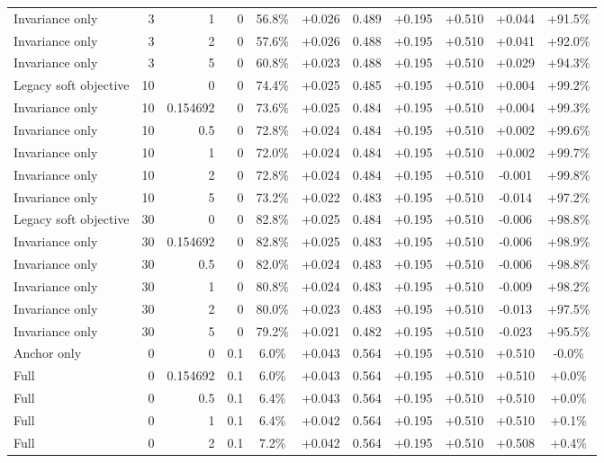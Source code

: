 \begin{table}[htbp]
\begin{tabular}{lrrrccccccc}
Invariance only & 3 & 1 & 0 & 56.8\% & +0.026 & 0.489 & +0.195 & +0.510 & +0.044 & +91.5\% \\
Invariance only & 3 & 2 & 0 & 57.6\% & +0.026 & 0.488 & +0.195 & +0.510 & +0.041 & +92.0\% \\
Invariance only & 3 & 5 & 0 & 60.8\% & +0.023 & 0.488 & +0.195 & +0.510 & +0.029 & +94.3\% \\
Legacy soft objective & 10 & 0 & 0 & 74.4\% & +0.025 & 0.485 & +0.195 & +0.510 & +0.004 & +99.2\% \\
Invariance only & 10 & 0.154692 & 0 & 73.6\% & +0.025 & 0.484 & +0.195 & +0.510 & +0.004 & +99.3\% \\
Invariance only & 10 & 0.5 & 0 & 72.8\% & +0.024 & 0.484 & +0.195 & +0.510 & +0.002 & +99.6\% \\
Invariance only & 10 & 1 & 0 & 72.0\% & +0.024 & 0.484 & +0.195 & +0.510 & +0.002 & +99.7\% \\
Invariance only & 10 & 2 & 0 & 72.8\% & +0.024 & 0.484 & +0.195 & +0.510 & -0.001 & +99.8\% \\
Invariance only & 10 & 5 & 0 & 73.2\% & +0.022 & 0.483 & +0.195 & +0.510 & -0.014 & +97.2\% \\
Legacy soft objective & 30 & 0 & 0 & 82.8\% & +0.025 & 0.484 & +0.195 & +0.510 & -0.006 & +98.8\% \\
Invariance only & 30 & 0.154692 & 0 & 82.8\% & +0.025 & 0.483 & +0.195 & +0.510 & -0.006 & +98.9\% \\
Invariance only & 30 & 0.5 & 0 & 82.0\% & +0.024 & 0.483 & +0.195 & +0.510 & -0.006 & +98.8\% \\
Invariance only & 30 & 1 & 0 & 80.8\% & +0.024 & 0.483 & +0.195 & +0.510 & -0.009 & +98.2\% \\
Invariance only & 30 & 2 & 0 & 80.0\% & +0.023 & 0.483 & +0.195 & +0.510 & -0.013 & +97.5\% \\
Invariance only & 30 & 5 & 0 & 79.2\% & +0.021 & 0.482 & +0.195 & +0.510 & -0.023 & +95.5\% \\
Anchor only & 0 & 0 & 0.1 & 6.0\% & +0.043 & 0.564 & +0.195 & +0.510 & +0.510 & -0.0\% \\
Full & 0 & 0.154692 & 0.1 & 6.0\% & +0.043 & 0.564 & +0.195 & +0.510 & +0.510 & +0.0\% \\
Full & 0 & 0.5 & 0.1 & 6.4\% & +0.043 & 0.564 & +0.195 & +0.510 & +0.510 & +0.0\% \\
Full & 0 & 1 & 0.1 & 6.4\% & +0.042 & 0.564 & +0.195 & +0.510 & +0.510 & +0.1\% \\
Full & 0 & 2 & 0.1 & 7.2\% & +0.042 & 0.564 & +0.195 & +0.510 & +0.508 & +0.4\% \\

\end{tabular}
\end{table}
